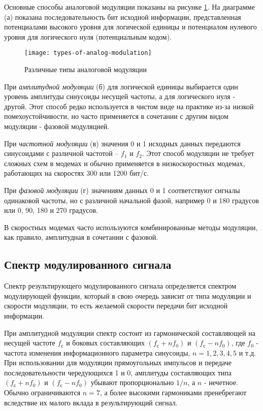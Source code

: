 Основные способы аналоговой модуляции показаны на рисунке \ref{fig:types-of-analog-modulation}.
На диаграмме (а) показана последовательность бит исходной информации, представленная потенциалами высокого уровня для логической единицы и потенциалом нулевого уровня для логического нуля (потенциальным кодом).

\begin{figure}[!ht]
    \centering
    \texttt{[image: types-of-analog-modulation]}
    \caption{Различные типы аналоговой модуляции}
    \label{fig:types-of-analog-modulation}
\end{figure}

При \emph{амплитудной модуляции} (б) для логической единицы выбирается один уровень амплитуды синусоиды несущей частоты, а для логического нуля - другой.
Этот способ редко используется в чистом виде на практике из-за низкой помехоустойчивости, но часто применяется в сочетании с другим видом модуляции - фазовой модуляцией.

При \emph{частотной модуляции} (в) значения 0 и 1 исходных данных передаются синусоидами с различной частотой – $f_1$ и $f_2$.
Этот способ модуляции не требует сложных схем в модемах и обычно применяется в низкоскоростных модемах, работающих на скоростях 300 или 1200 бит/с.

При \emph{фазовой модуляции} (г) значениям данных 0 и 1 соответствуют сигналы одинаковой частоты, но с различной начальной фазой, например 0 и 180 градусов или 0, 90, 180 и 270 градусов.

В скоростных модемах часто используются комбинированные методы модуляции, как правило, амплитудная в сочетании с фазовой.

\subsection{Спектр модулированного сигнала}

Спектр результирующего модулированного сигнала определяется спектром модулирующей функции, который в свою очередь зависит от типа модуляции и скорости модуляции, то есть желаемой скорости передачи бит исходной информации.

При амплитудной модуляции спектр состоит из гармонической составляющей на несущей частоте $f_\text{с}$ и боковых составляющих $(f_\text{с} + n f_0)$ и $(f_\text{с} - n f_0)$, где $f_0$ - частота изменения информационного параметра синусоиды, $n = 1, 2, 3, 4, 5$ и т.д.
При использовании для модуляции прямоугольных импульсов и передаче последовательности чередующихся 1 и 0, амплитуды составляющих типа $(f_\text{с} + n f_0)$ и $(f_\text{с} - n f_0)$ убывают пропорционально $1 / n$, а $n$ - нечетное.
Обычно ограничиваются $n = 7$, а более высокими гармониками пренебрегают вследствие их малого вклада в результирующий сигнал.

